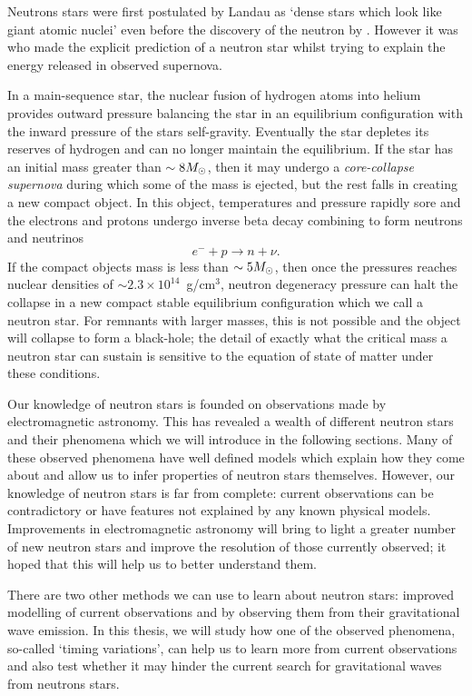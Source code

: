 \documentclass[../full_thesis/full_thesis.tex]{subfiles}
\begin{document}
 

Neutrons stars were first postulated by Landau as `dense stars
which look like giant atomic nuclei' \citep{Yakovlev2013} even before the
discovery of the neutron by \citet{Chadwick1932}. However it was
\citet{Baade1934} who made the explicit prediction of a neutron star whilst
trying to explain the energy released in observed supernova.

In a main-sequence star, the nuclear fusion of
hydrogen atoms into helium provides outward pressure balancing the star in an
equilibrium configuration with the inward pressure of the stars self-gravity.
Eventually the star depletes its reserves of hydrogen and can no longer
maintain the equilibrium. If the star has an initial mass greater than $\sim 8
M_{\odot}$, then it may undergo a \emph{core-collapse supernova} during which some
of the mass is ejected, but the rest falls in creating a new compact object.
In this object, temperatures and pressure rapidly sore and the
electrons and protons undergo inverse beta decay combining to form neutrons and
neutrinos
\begin{equation}
    e^{-} + p \rightarrow n + \nu.
\end{equation}
If the compact objects mass is less than $\sim 5 M_{\odot}$, then once the pressures
reaches nuclear densities of $\sim 2.3 \times10^{14}$~g/cm$^{3}$, neutron
degeneracy pressure can halt the collapse in a new compact stable equilibrium
configuration which we call a neutron star. For remnants with larger masses,
this is not possible and the object will collapse to form a black-hole; the
detail of exactly what the critical mass a neutron star can sustain is
sensitive to the equation of state of matter under these conditions.

Our knowledge of neutron stars is founded on observations made by
electromagnetic astronomy. This has revealed a wealth of different neutron
stars and their phenomena which we will introduce in the following sections.
Many of these observed phenomena have well defined models which explain how
they come about and allow us to infer properties of neutron stars themselves.
However, our knowledge of neutron stars is far from complete: current
observations can be contradictory or have features not explained by any known
physical models. Improvements in electromagnetic astronomy will bring to light
a greater number of new neutron stars and improve the resolution of those
currently observed; it hoped that this will help us to better understand them.

There are two other methods we can use to learn about neutron stars: improved
modelling of current observations and by observing them from their
gravitational wave emission. In this thesis, we will study how one of the
observed phenomena, so-called `timing variations', can help us to learn more
from current observations and also test whether it may hinder the current
search for gravitational waves from neutrons stars.
\end{document}
